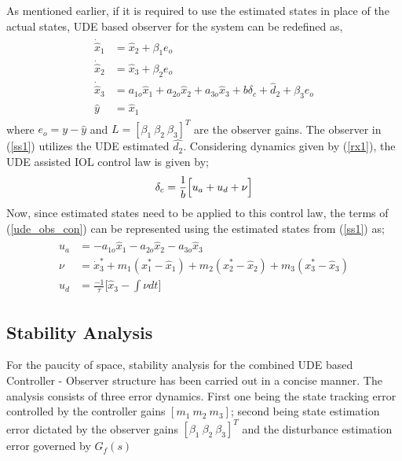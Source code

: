 \documentclass[conference]{IEEEtran}
\begin{document}
		As mentioned earlier, if it is required to use the estimated states in place of the actual states, UDE based observer for the system can be redefined as,
		\begin{eqnarray}
			\begin{aligned}
				\dot{\hat{x}}_1 &= \hat{x}_2 + \beta_1 e_o\\
				\dot{\hat{x}}_2 &= \hat{x}_3 + \beta_2 e_o\\
				\dot{\hat{x}}_3 &= a_{1o}\hat{x}_1 + a_{2o}\hat{x}_2 + a_{3o}\hat{x}_3 + b \delta_c + \hat{d}_2 + \beta_3 e_o\\		
				\hat{y} &= \hat{x}_1 \label{ss1}
			\end{aligned}
		\end{eqnarray}
		where $e_o = y - \hat{y}$ and $L = [\beta_1\ \beta_2\ \beta_3]^T$ are the observer gains. The observer in (\ref{ss1}) utilizes the UDE estimated $\hat{d_2}$. Considering dynamics given by (\ref{rx1}), the UDE assisted IOL control law is given by;
		\begin{equation}
				\delta_c = \frac{1}{b}\Big[u_a+u_d+\nu\Big] \\ \label{ude_obs_con}
		\end{equation}
		Now, since estimated states need to be applied to this control law, the terms of (\ref{ude_obs_con}) can be represented using the estimated states from (\ref{ss1}) as; 		
		\begin{eqnarray}
			\begin{aligned}
				u_a &= -a_{1o}\hat{x}_1 - a_{2o}\hat{x}_2 - a_{3o}\hat{x}_3 \\
				\nu &= \dot{x}^\ast_3+m_1(x^\ast_1-\hat{x}_1) + m_2(x^\ast_2-\hat{x}_2) + m_3(x^\ast_3-\hat{x}_3) \\
				u_d &= \frac{-1}{\tau}\Big[\hat{x}_3-\int{\nu dt}\Big] \label{ud} \nonumber
			\end{aligned}
		\end{eqnarray}
							
	\subsection{Stability Analysis}
		For the paucity of space, stability analysis for the combined UDE based Controller - Observer structure has been carried out in a concise manner. The analysis consists of three error dynamics. First one being the state tracking error controlled by the controller gains $[m_1~m_2~m_3]$; second being state estimation error dictated by the observer gains $[\beta_1\ \beta_2\ \beta_3]^T$ and the disturbance estimation error governed by $G_f(s)$ 
		
\end{document}
